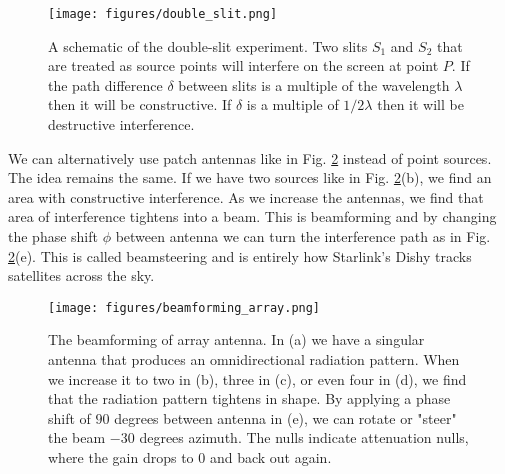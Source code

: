 \documentclass[10pt]{article}
\begin{document}
\begin{figure}[h!]
\centering
\texttt{[image: figures/double\_slit.png]}
\caption{A schematic of the double-slit experiment. Two slits $S_1$ and $S_2$ that are treated as source points will interfere on the screen at point $P$. If the path difference $\delta$ between slits is a multiple of the wavelength $\lambda$ then it will be constructive. If $\delta$ is a multiple of $1/2\lambda$ then it will be destructive interference\cite{mit_waves}\cite{pedrotti_pedrotti_pedrotti_2019}.}
\label{fig:double_slit}
\end{figure}

We can alternatively use patch antennas like in Fig. \ref{fig:beamforming} instead of point sources. The idea remains the same. If we have two sources like in Fig. \ref{fig:beamforming}(b), we find an area with constructive interference. As we increase the antennas, we find that area of interference tightens into a beam. This is beamforming and by changing the phase shift $\phi$ between antenna we can turn the interference path as in Fig. \ref{fig:beamforming}(e). This is called beamsteering and is entirely how Starlink's Dishy tracks satellites across the sky.

\begin{figure}[h!]
\centering
\texttt{[image: figures/beamforming\_array.png]}
\caption{The beamforming of array antenna. In (a) we have a singular antenna that produces an omnidirectional radiation pattern. When we increase it to two in (b), three in (c), or even four in (d), we find that the radiation pattern tightens in shape. By applying a phase shift of $90$ degrees between antenna in (e), we can rotate or "steer" the beam $-30$ degrees azimuth. The nulls indicate attenuation nulls, where the gain drops to $0$ and back out again\cite{Rumney_2013}.}
\label{fig:beamforming}
\end{figure}
\end{document}
